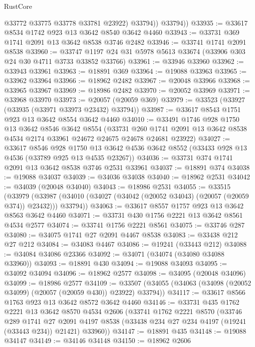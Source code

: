 \begin{lexlean}{RustCore}
\begin{coremodule}
              @33772
              @33775
              @33778
              @33781
              @23922)
            @33794))
        @33794))
@33935 := @33617 @8534 @1742 @923 @13 @3642 @8540 @3642 @4460
@33943 := @33731 @369 @1741 @2091 @13 @3642 @8538 @3746 @2482
@33946 := @33741 @1741 @2091 @8538
@33960 := @33747 @1197 @24 @31 @5978 @5613 @33674 (@33906 @303 @24 @30 @4711 @3733 @33852 @33766)
@33961 := @33946 @33960
@33962 := @33943 @33961
@33963 := @18891 @369
@33964 := @19088 @33963
@33965 := @33962 @33964
@33966 := @18962 @2482
@33967 := @20048 @33966
@33968 := @33965 @33967
@33969 := @18986 @2482
@33970 := @20052 @33969
@33971 := @33968 @33970
@33973 := @20057 (@20059 @369)
@33979 := @33523 (@33927 (@33935 (@33971 @33973 @23432) @33794))
@33987 := @33617 @8543 @1751 @923 @13 @3642 @8554 @3642 @4460
@34010 := @33491
    @1746
    @928
    @1750
    @13
    @3642
    @8546
    @3642
    @8554
    (@33731 @260 @1741 @2091 @13 @3642 @8538 @4534 @2174 @33961 @24672 @24675 @24678 @24681 @23922)
@34027 := @33617
    @8546
    @928
    @1750
    @13
    @3642
    @4536
    @3642
    @8552
    (@33433 @928 @13 @4536 (@33789 @925 @13 @4535 @23267))
@34036 := @33731 @374 @1741 @2091 @13 @3642 @8538 @3746 @2531 @33961
@34037 := @18891 @374
@34038 := @19088 @34037
@34039 := @34036 @34038
@34040 := @18962 @2531
@34042 := @34039 (@20048 @34040)
@34043 := @18986 @2531
@34055 := @33515
    (@33979
      (@33987 (@34010 (@34027 (@34042 (@20052 @34043) (@20057 (@20059 @374)) @23432))) @33794))
@34063 := @33617 @8557 @1757 @923 @13 @3642 @8563 @3642 @4460
@34071 := @33731 @430 @1756 @2221 @13 @3642 @8561 @4534 @2577
@34074 := @33741 @1756 @2221 @8561
@34075 := @33746 @287
@34080 := @34075 @1741 @27 @2091 @4467 @8538
@34083 := @33438 @212 @27 @212
@34084 := @34083 @4467
@34086 := @19241 (@33443 @212)
@34088 := @34084 @34086 @23366
@34092 := @34071 (@34074 (@34080 @34088 @33960))
@34093 := @18891 @430
@34094 := @19088 @34093
@34095 := @34092 @34094
@34096 := @18962 @2577
@34098 := @34095 (@20048 @34096)
@34099 := @18986 @2577
@34109 := @33507 (@34055 (@34063 (@34098 (@20052 @34099) (@20057 (@20059 @430)) @23922) @33794))
@34117 := @33617 @8566 @1763 @923 @13 @3642 @8572 @3642 @4460
@34146 := @33731
    @435
    @1762
    @2221
    @13
    @3642
    @8570
    @4534
    @2606
    (@33741
      @1762
      @2221
      @8570
      (@33746
        @289
        @1741
        @27
        @2091
        @4197
        @8538
        (@33438 @234 @27 @234 @4197 (@19241 (@33443 @234)) @21421)
        @33960))
@34147 := @18891 @435
@34148 := @19088 @34147
@34149 := @34146 @34148
@34150 := @18962 @2606

\end{coremodule}
\end{lexlean}
